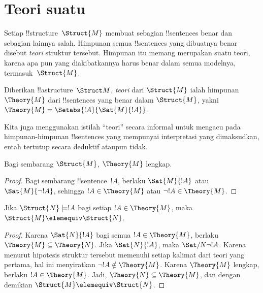 \documentclass[../../../include/open-logic-section]{subfiles}
\begin{document}

\section{Teori suatu }

Setiap !!{structure}~$\Struct{M}$ membuat sebagian !!{sentence}s benar dan
sebagian lainnya salah. Himpunan semua !!{sentence}s yang dibuatnya benar
disebut \emph{teori} struktur tersebut. Himpunan itu memang merupakan suatu
teori, karena apa pun yang diakibatkannya harus benar dalam semua modelnya,
termasuk~$\Struct{M}$.

\begin{defn}
  Diberikan !!a{structure}~$\Struct M$, \emph{teori} dari $\Struct{M}$
  ialah himpunan $\Theory{M}$ dari !!{sentence}s yang benar dalam
  $\Struct{M}$, yakni $\Theory{M} = \Setabs{!A}{\Sat{M}{!A}}$.
\end{defn}

Kita juga menggunakan istilah ``teori'' secara informal untuk mengacu pada
himpunan-himpunan !!{sentence}s yang mempunyai interpretasi yang dimaksudkan,
entah tertutup secara deduktif ataupun tidak.

\begin{prop}
Bagi sembarang $\Struct{M}$, $\Theory{M}$ lengkap.
\end{prop}

\begin{proof}
Bagi sembarang !!{sentence}~$!A$, berlaku $\Sat{M}{!A}$ atau
$\Sat{M}{\lnot !A}$, sehingga $!A \in \Theory{M}$ atau
$\lnot !A \in \Theory{M}$.
\end{proof}

\begin{prop}
  Jika $\Struct{N} \models !A$ bagi setiap $!A \in \Theory{M}$, maka
  $\Struct{M} \elemequiv \Struct{N}$.
\end{prop}

\begin{proof}
Karena $\Sat{N}{!A}$ bagi semua $!A \in \Theory{M}$, berlaku
$\Theory{M} \subseteq \Theory{N}$. Jika $\Sat{N}{!A}$, maka
$\Sat/{N}{\lnot !A}$. Karena menurut hipotesis struktur tersebut memenuhi
setiap kalimat dari teori yang pertama, hal ini menyiratkan
$\lnot !A \notin \Theory{M}$. Karena
$\Theory{M}$ lengkap, berlaku $!A \in \Theory{M}$. Jadi,
$\Theory{N} \subseteq \Theory{M}$, dan dengan demikian
$\Struct{M} \elemequiv \Struct{N}$.
\end{proof}
\end{document}
